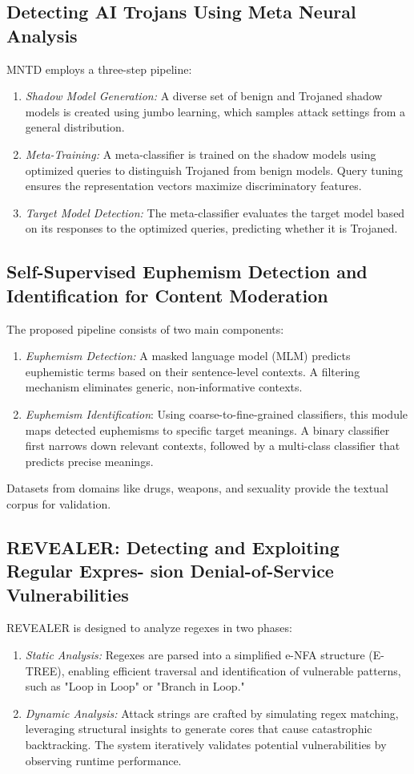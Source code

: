 \documentclass[conference]{IEEEtran}
\begin{document}
\subsection{\textbf{Detecting AI Trojans Using Meta Neural Analysis}}
MNTD employs a three-step pipeline:
\begin{enumerate}
    \item 
\textit{Shadow Model Generation:} A diverse set of benign and Trojaned shadow models is created using jumbo learning, which samples attack settings from a general distribution.
\item 
\textit{Meta-Training:} A meta-classifier is trained on the shadow models using optimized queries to distinguish Trojaned from benign models. Query tuning ensures the representation vectors maximize discriminatory features.
\item 
\textit{Target Model Detection:} The meta-classifier evaluates the target model based on its responses to the optimized queries, predicting whether it is Trojaned.
\end{enumerate}
\subsection{\textbf{Self-Supervised Euphemism Detection and Identification for Content Moderation}}
The proposed pipeline consists of two main components:
\begin{enumerate}
    \item 
\textit{Euphemism Detection:} A masked language model (MLM) predicts euphemistic terms based on their sentence-level contexts. A filtering mechanism eliminates generic, non-informative contexts.
\item 
\textit{Euphemism Identification}: Using coarse-to-fine-grained classifiers, this module maps detected euphemisms to specific target meanings. A binary classifier first narrows down relevant contexts, followed by a multi-class classifier that predicts precise meanings.
\end{enumerate}
Datasets from domains like drugs, weapons, and sexuality provide the textual corpus for validation.
\subsection{\textbf{REVEALER: Detecting and Exploiting Regular Expres-
sion Denial-of-Service Vulnerabilities}}
REVEALER is designed to analyze regexes in two phases:
\begin{enumerate}
    \item \textit{Static Analysis:} Regexes are parsed into a simplified e-NFA structure (E-TREE), enabling efficient traversal and identification of vulnerable patterns, such as "Loop in Loop" or "Branch in Loop."
    \item \textit{Dynamic Analysis:} Attack strings are crafted by simulating regex matching, leveraging structural insights to generate cores that cause catastrophic backtracking. The system iteratively validates potential vulnerabilities by observing runtime performance.
\end{enumerate}
\end{document}
